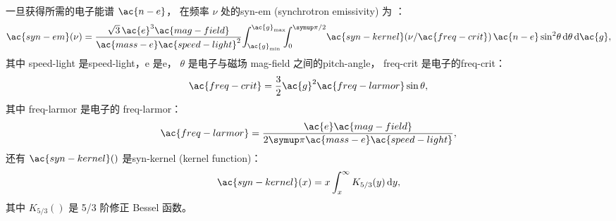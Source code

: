 一旦获得所需的电子能谱 $\ac{n-e}$，
在频率 $\nu$ 处的\acl{syn-em} (synchrotron emissivity) 为 \cite{rybicki1979}：
\begin{equation}
  \label{sec:jnu-sync}
  \ac{syn-em}(\nu) =
    \frac{\sqrt{3} \,\ac{e}^3 \ac{mag-field}}{\ac{mass-e}\ac{speed-light}^2}
    \!\int_{\ac{g}_{\R{min}}}^{\ac{g}_{\R{max}}}
    \!\!\!\int_0^{\Cpi/2} \!\ac{syn-kernel}( \nu / \ac{freq-crit} )
    \,\ac{n-e} \sin^2 \!\theta \,\D{\theta} \,\D{\ac{g}} ,
\end{equation}
其中
\ac{speed-light} 是\acl{speed-light}，\ac{e} 是\acl{e}，
$\theta$ 是电子与磁场 \ac{mag-field} 之间的\ac{pitch-angle}，
\ac{freq-crit} 是电子的\acl{freq-crit}：
\begin{equation}
  \ac{freq-crit} = \frac{3}{2} \ac{g}^2 \ac{freq-larmor} \sin\theta ,
\end{equation}
其中 \ac{freq-larmor} 是电子的 \acl{freq-larmor}：
\begin{equation}
  \ac{freq-larmor} =
    \frac{\ac{e}\ac{mag-field}}{2\Cpi \ac{mass-e}\ac{speed-light}} ,
\end{equation}
还有 $\ac{syn-kernel}()$ 是\acl{syn-kernel} (kernel function)：
\begin{equation}
  \ac{syn-kernel}(x) = x \int_x^{\infty} K_{5/3}(y) \,\D{y} ,
\end{equation}
其中 $K_{5/3}()$ 是 5/3 阶修正 Bessel 函数。

